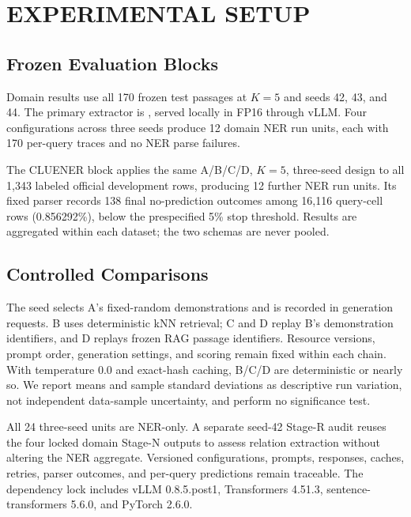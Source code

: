\section{EXPERIMENTAL SETUP}

\subsection{Frozen Evaluation Blocks}

Domain results use all 170 frozen test passages at $K=5$ and seeds 42, 43,
and 44. The primary extractor is
 \cite{qwen2024qwen25}, served locally in FP16
through vLLM. Four configurations across three seeds produce 12 domain NER run
units, each with 170 per-query traces and no NER parse failures.

The CLUENER block applies the same A/B/C/D, $K=5$, three-seed design to all
1,343 labeled official development rows, producing 12 further NER run units.
Its fixed parser records 138 final no-prediction outcomes among 16,116
query-cell rows (0.856292\%), below the prespecified 5\% stop threshold. Results
are aggregated within each dataset; the two schemas are never pooled.

\subsection{Controlled Comparisons}

The seed selects A's fixed-random demonstrations and is recorded in generation
requests. B uses deterministic kNN retrieval; C and D replay B's demonstration
identifiers, and D replays frozen RAG passage identifiers. Resource versions,
prompt order, generation settings, and scoring remain fixed within each chain.
With temperature 0.0 and exact-hash caching, B/C/D are deterministic or nearly
so. We report means and sample standard deviations as descriptive run
variation, not independent data-sample uncertainty, and perform no significance
test.

All 24 three-seed units are NER-only. A separate seed-42 Stage-R audit reuses
the four locked domain Stage-N outputs to assess relation extraction without
altering the NER aggregate. Versioned configurations, prompts, responses,
caches, retries, parser outcomes, and per-query predictions remain traceable.
The dependency lock includes vLLM 0.8.5.post1, Transformers 4.51.3,
sentence-transformers 5.6.0, and PyTorch 2.6.0.
